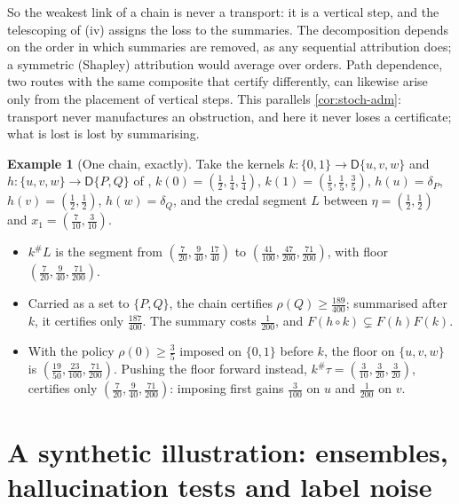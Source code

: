 \documentclass[11pt]{article}
\theoremstyle{definition}
\newtheorem{example}[theorem]{Example}
\theoremstyle{remark}
\newcommand{\D}{\mathsf{D}}
\begin{document}
So the weakest link of a chain is never a transport: it is a vertical step, and the telescoping of (iv) assigns the loss to the
summaries. The decomposition depends on the order in which summaries are removed, as any sequential attribution does; a symmetric
(Shapley) attribution would average over orders. Path dependence, two routes with the same composite that certify differently,
can likewise arise only from the placement of vertical steps. This parallels \cref{cor:stoch-adm}: transport never manufactures an
obstruction, and here it never loses a certificate; what is lost is lost by summarising.

\begin{example}[One chain, exactly]\label{ex:leafspring}
Take the kernels $k\colon\{0,1\}\to\D\{u,v,w\}$ and $h\colon\{u,v,w\}\to\D\{P,Q\}$ of \cite[Section~11]{Awasthi-Family},
$k(0)=(\tfrac12,\tfrac14,\tfrac14)$, $k(1)=(\tfrac15,\tfrac15,\tfrac35)$, $h(u)=\delta_P$, $h(v)=(\tfrac12,\tfrac12)$, $h(w)=\delta_Q$,
and the credal segment $L$ between $\eta=(\tfrac12,\tfrac12)$ and $x_1=(\tfrac7{10},\tfrac3{10})$.
\begin{itemize}[leftmargin=*,nosep]
\item $k^\#L$ is the segment from $(\tfrac7{20},\tfrac9{40},\tfrac{17}{40})$ to $(\tfrac{41}{100},\tfrac{47}{200},\tfrac{71}{200})$,
  with floor $(\tfrac7{20},\tfrac9{40},\tfrac{71}{200})$.
\item Carried as a set to $\{P,Q\}$, the chain certifies $\rho(Q)\ge\tfrac{189}{400}$; summarised after $k$, it certifies only
  $\tfrac{187}{400}$. The summary costs $\tfrac1{200}$, and $F(h\circ k)\subsetneq F(h)F(k)$.
\item With the policy $\rho(0)\ge\tfrac35$ imposed on $\{0,1\}$ before $k$, the floor on $\{u,v,w\}$ is
  $(\tfrac{19}{50},\tfrac{23}{100},\tfrac{71}{200})$. Pushing the floor forward instead, $k^\#\tau=(\tfrac3{10},\tfrac3{20},\tfrac3{20})$,
  certifies only $(\tfrac7{20},\tfrac9{40},\tfrac{71}{200})$: imposing first gains $\tfrac3{100}$ on $u$ and $\tfrac1{200}$ on $v$.
\end{itemize}
\end{example}

\section{A synthetic illustration: ensembles, hallucination tests and label noise}\label{sec:synthetic}
\end{document}
